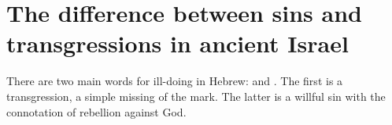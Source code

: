 \section{The difference between sins and transgressions in ancient Israel}\label{app:sins}
There are two main words for ill-doing in Hebrew:  and . The first is a transgression, a simple missing of the mark. The latter is a willful sin with the connotation of rebellion against God.
